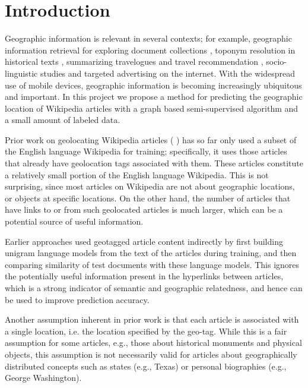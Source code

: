 \section{Introduction}
Geographic information is relevant in several contexts; for example, geographic information retrieval for exploring document collections \cite{ding2000computing}, toponym resolution in historical texts \cite{smith2001disambiguating}, summarizing travelogues and travel recommendation \cite{hao-et-al:10}, socio-linguistic studies \cite{eisenstein-smith-xing:11} and targeted advertising on the internet. With the widespread use of mobile devices, geographic information is becoming increasingly ubiquitous and important. In this project we propose a method for predicting the geographic location of Wikipedia articles with a graph based semi-supervised algorithm and a small amount of labeled data.

Prior work on geolocating Wikipedia articles (\cite{wing-baldridge:11} \cite{rolleretal:12}) has so far only used a subset of the English language Wikipedia for training; specifically, it uses those articles that already have geolocation tags associated with them. 
These articles constitute a relatively small portion of the English language Wikipedia.  This is not surprising, since most articles on Wikipedia are not about geographic locations, or objects at specific locations.
On the other hand, the number of articles that have links to or from such geolocated articles is much larger, which can be a potential source of useful information. 

Earlier approaches used geotagged article content indirectly by first building unigram language models from the text of the articles during training, and then comparing similarity of test documents with these language models. This ignores the potentially useful information present in the  hyperlinks between articles, which is a strong indicator of semantic and geographic relatedness, and hence can be used to improve prediction accuracy.

Another assumption inherent in prior work is that each article is associated with a single location, i.e. the location specified by the geo-tag. While this is a fair assumption for some articles, e.g., those about historical monuments and physical objects, this assumption is not necessarily valid for articles about geographically distributed concepts such as states (e.g., Texas) or personal biographies (e.g., George Washington). 

